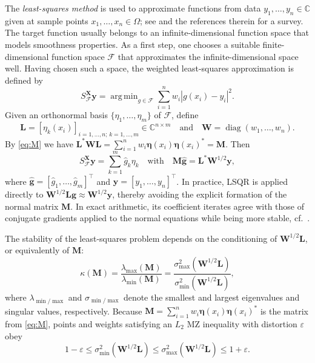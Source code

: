 \documentclass[a4paper]{amsart}
\numberwithin{equation}{section}
\DeclareMathOperator{\diag}{diag}
\DeclareMathOperator{\argmin}{arg\,min}
\begin{document}
The \emph{least-squares method} is used to approximate functions from data $y_1,\dots,y_n\in\mathds C$ given at sample points $x_1,\dots,x_n\in\Omega$; see \cite{Barteldiss} and the references therein for a survey.
The target function usually belongs to an infinite-dimensional function space that models smoothness properties.
As a first step, one chooses a suitable finite-dimensional function space $\mathcal F$ that approximates the infinite-dimensional space well.
Having chosen such a space, the weighted least-squares approximation is defined by
\begin{equation}\label{eq:lsqr}
    S_{\mathcal F}^{\bm X} \bm y
    = \argmin_{g\in\mathcal F} \sum_{i=1}^{n}w_i|g(x_i)-y_i|^2 .
\end{equation}
Given an orthonormal basis $\{\eta_1,\dots,\eta_m\}$ of $\mathcal F$, define
\begin{equation*}
    \bm L = [\eta_k(x_i)]_{i=1,\dots,n;\,k=1,\dots,m}\in\mathds C^{n\times m}
    \quad\text{and}\quad
    \bm W=\diag(w_1,\dots,w_n).
\end{equation*}
By \eqref{eq:M} we have $\bm L^\ast\bm W\bm L = \sum_{i=1}^{n}w_i\bm\eta(x_i)\bm\eta(x_i)^\ast = \bm M$.
Then
\begin{equation*}
    S_{\mathcal F}^{\bm X} \bm y = \sum_{k=1}^{m}\hat g_k\eta_k
    \quad\text{with}\quad
    \bm M \bm{\hat g} = \bm L^\ast\bm W^{1/2}\bm y,
\end{equation*}
where $\bm{\hat g} = [\hat g_1,\dots,\hat g_m]^\top$ and $\bm y = [y_1,\dots,y_n]^\top$.
In practice, LSQR is applied directly to $\bm W^{1/2}\bm L\widehat{\bm g}\approx \bm W^{1/2}\bm y$, thereby avoiding the explicit formation of the normal matrix $\bm M$.
In exact arithmetic, its coefficient iterates agree with those of conjugate gradients applied to the normal equations while being more stable, cf.~\cite{PS82}.

The stability of the least-squares problem depends on the conditioning of $\bm W^{1/2}\bm L$, or equivalently of $\bm M$:
\begin{equation*}
    \kappa(\bm M)
    = \frac{\lambda_{\max}(\bm M)}{\lambda_{\min}(\bm M)}
    = \frac{\sigma_{\max}^2(\bm W^{1/2}\bm L)}{\sigma_{\min}^2(\bm W^{1/2}\bm L)},
\end{equation*}
where $\lambda_{\min/\max}$ and $\sigma_{\min/\max}$ denote the smallest and largest eigenvalues and singular values, respectively.
Because $\bm M=\sum_{i=1}^{n}w_i\bm\eta(x_i)\bm\eta(x_i)^\ast$ is the matrix from \eqref{eq:M}, points and weights satisfying an $L_2$ MZ inequality with distortion $\varepsilon$ obey
\begin{equation}\label{eq:singularvalues}
    1-\varepsilon
    \le \sigma_{\min}^2(\bm W^{1/2}\bm L)
    \le \sigma_{\max}^2(\bm W^{1/2}\bm L)
    \le 1+\varepsilon.
\end{equation}
\end{document}
